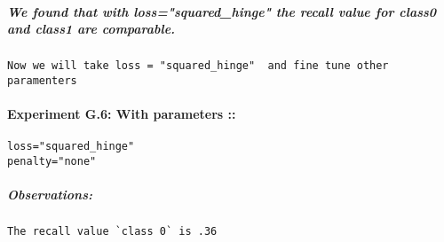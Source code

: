 \documentclass[11pt]{article}
\begin{document}
    \subparagraph{We found that with loss="squared\_hinge" the recall value
for class0 and class1 are
comparable.}\label{we-found-that-with-losssquaredux5fhinge-the-recall-value-for-class0-and-class1-are-comparable.}

\begin{verbatim}
Now we will take loss = "squared_hinge"  and fine tune other paramenters
\end{verbatim}

    \paragraph{Experiment G.6: With parameters
::}\label{experiment-g.6-with-parameters}

\begin{verbatim}
loss="squared_hinge"
penalty="none"
\end{verbatim}

\subparagraph{Observations:}\label{observations}

\begin{verbatim}
The recall value `class 0` is .36
\end{verbatim}
\end{document}
